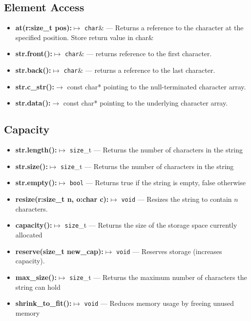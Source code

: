 \documentclass{report}
\begin{document}
    \bigbreak \noindent 
    \subsection{Element Access}
    \begin{itemize}
        \item \textbf{at(r:size\_t pos):}$\mapsto$ \texttt{char}\& --- Returns a reference to the character at the specified position. Store return value in char\&
        \item \textbf{str.front():}$\mapsto$ \texttt{char}\& --- returns reference to the first character. 
        \item \textbf{str.back():}$\mapsto$ \texttt{char}\& --- returns a reference to the last character. 
        \item \textbf{str.c\_str():}$\rightarrow$ const char* pointing to the null-terminated character array.
        \item \textbf{str.data():}$\to$ const char* pointing to the underlying character array.        
    \end{itemize}
    \bigbreak \noindent 
    \subsection{Capacity}
    \begin{itemize}
        \item \textbf{str.length():}$\mapsto$ \texttt{size}\_t --- Returns the number of characters in the string 
        \item \textbf{str.size():}$\mapsto$ \texttt{size}\_t --- Returns the number of characters in the string 
        \item \textbf{str.empty():}$\mapsto$ \texttt{bool} --- Returns true if the string is empty, false otherwise 
        \item \textbf{resize(r:size\_t n, o:char c):}$\mapsto$ \texttt{void} --- Resizes the string to contain $n$ characters.
        \item \textbf{capacity():}$\mapsto$ \texttt{size}\_t --- Returns the size of the storage space currently allocated 
        \item \textbf{reserve(size\_t new\_cap):}$\mapsto$ \texttt{void} --- Reserves storage (increases capacity).
        \item \textbf{max\_size():}$\mapsto$ \texttt{size}\_t --- Returns the maximum number of characters the string can hold 
        \item \textbf{shrink\_to\_fit():}$\mapsto$ \texttt{void} --- Reduces memory usage by freeing unused memory 
    \end{itemize}
    \bigbreak \noindent 
\end{document}
